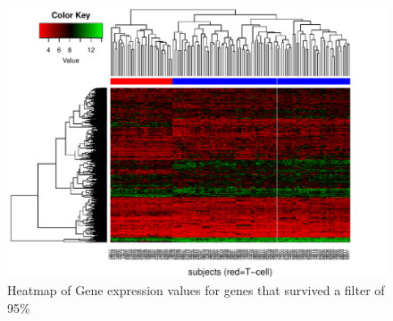 \documentclass[11pt,letter]{article}\usepackage[]{graphicx}\usepackage[]{color}
\makeatletter
\def\maxwidth{ %
  \ifdim\Gin@nat@width>\linewidth
    \linewidth
  \else
    \Gin@nat@width
  \fi
}
\newenvironment{knitrout}{}{} %
\makeatother
\begin{document}
\begin{knitrout}
\color{fgcolor}\begin{figure}[H]

{\centering \includegraphics[width=\maxwidth]{figure/heatmap-centroid-95-2-1} 

}

\caption[Heatmap of Gene expression values for genes that survived a filter of 95\%]{Heatmap of Gene expression values for genes that survived a filter of 95\%}\label{fig:heatmap-centroid-95-2}
\end{figure}


\end{knitrout}




\FloatBarrier

\end{document}
